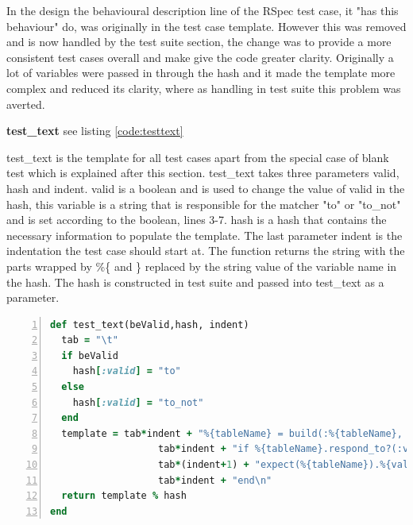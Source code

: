 \documentclass[a4paper,12pt]{article}
\begin{document}
\par  In the design the behavioural description line of the RSpec test case, it "has this behaviour" do, was originally in the test case template. However this was removed and is now handled by the test suite section, the change was to provide a more consistent test cases overall and make give the code greater clarity. Originally a lot of variables were passed in through the hash and it made the template more complex and reduced its clarity, where as handling in test suite this problem was averted.
\vspace{3mm}
\par \textbf{test\_text} see listing \ref{code:testtext}
\par test\_text is the template for all test cases apart from the special case of blank test which is explained after this section. test\_text takes three parameters valid, hash and indent. valid is a boolean and is used to change the value of valid in the hash, this variable is a string that is responsible for the matcher "to" or "to\_not" and is set according to the boolean, lines 3-7. hash is a hash that contains the necessary information to populate the template. The last parameter indent is the indentation the test case should start at. The function returns the string with the parts wrapped by \%\{ and \} replaced by the string value of the variable name in the hash. The hash is constructed in test suite and passed into test\_text as a parameter.
\begin{landscape}
\begin{lstlisting}[frame=single,numbers=left,language = ruby,caption= {test\_text}, label={code:testtext}]
def test_text(beValid,hash, indent)
  tab = "\t"
  if beValid
    hash[:valid] = "to"
  else
    hash[:valid] = "to_not"
  end
  template = tab*indent + "%{tableName} = build(:%{tableName}, %{fieldName}: %{generatedValue})\n" +
                   tab*indent + "if %{tableName}.respond_to?(:valid?)\n" +
                   tab*(indent+1) + "expect(%{tableName}).%{valid} be_valid, lambda {%{tableName}.errors.full_messages.join(\"\\n\")}\n" +
                   tab*indent + "end\n" 
  return template % hash
end
\end{lstlisting}
\end{landscape}
\end{document}
